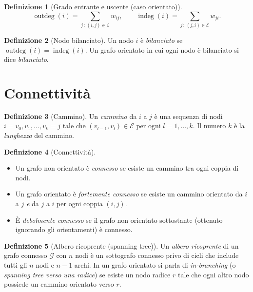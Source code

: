 \documentclass[a4paper,11pt]{article}
\theoremstyle{definition}
\newtheorem{defn}{Definizione}[section]
\theoremstyle{plain}
\theoremstyle{remark}
\DeclareMathOperator{\outdeg}{outdeg}
\DeclareMathOperator{\indeg}{indeg}
\begin{document}
\begin{defn}[Grado entrante e uscente (caso orientato)]
\[
  \outdeg(i) = \sum_{j \,:\, (i,j)\in\mathcal{E}} w_{ij}, \qquad
  \indeg(i)  = \sum_{j \,:\, (j,i)\in\mathcal{E}} w_{ji}.
\]
\end{defn}

\begin{defn}[Nodo bilanciato]
Un nodo $i$ è \emph{bilanciato} se $\outdeg(i) = \indeg(i)$.
Un grafo orientato in cui ogni nodo è bilanciato si dice \emph{bilanciato}.
\end{defn}

\section{Connettività}

\begin{defn}[Cammino]
Un \emph{cammino} da $i$ a $j$ è una sequenza di nodi
$i = v_0, v_1, \ldots, v_k = j$ tale che $(v_{l-1}, v_l) \in \mathcal{E}$
per ogni $l = 1, \ldots, k$. Il numero $k$ è la \emph{lunghezza} del cammino.
\end{defn}

\begin{defn}[Connettività]
\begin{itemize}[noitemsep]
  \item Un grafo non orientato è \emph{connesso} se esiste un cammino tra
        ogni coppia di nodi.
  \item Un grafo orientato è \emph{fortemente connesso} se esiste un cammino
        orientato da $i$ a $j$ \emph{e} da $j$ a $i$ per ogni coppia
        $(i,j)$.
  \item È \emph{debolmente connesso} se il grafo non orientato sottostante
        (ottenuto ignorando gli orientamenti) è connesso.
\end{itemize}
\end{defn}

\begin{defn}[Albero ricoprente (spanning tree)]
Un \emph{albero ricoprente} di un grafo connesso $\mathcal{G}$ con $n$ nodi è un
sottografo connesso privo di cicli che include tutti gli $n$ nodi e $n-1$ archi.
In un grafo orientato si parla di \emph{in-branching} (o \emph{spanning tree verso
una radice}) se esiste un nodo radice $r$ tale che ogni altro nodo possiede un
cammino orientato verso $r$.
\end{defn}
\end{document}
